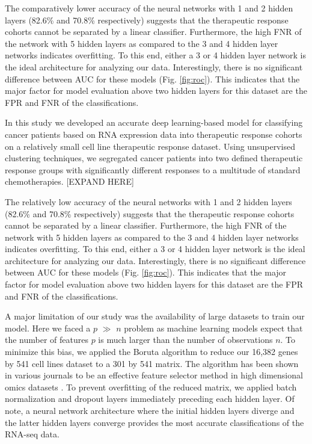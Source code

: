 \documentclass[10pt, letterpaper]{article}
\begin{document}
\begin{multicols}{2}
The comparatively lower accuracy of the neural networks with 1 and 2 hidden layers (82.6\% and 70.8\% respectively) suggests that the therapeutic response cohorts cannot be separated by a linear classifier. Furthermore, the high FNR of the network with 5 hidden layers as compared to the 3 and 4 hidden layer networks indicates overfitting. To this end, either a 3 or 4 hidden layer network is the ideal architecture for analyzing our data. Interestingly, there is no significant difference between AUC for these models (Fig. \ref{fig:roc}). This indicates that the major factor for model evaluation above two hidden layers for this dataset are the FPR and FNR of the classifications.

In this study we developed an accurate deep learning-based model for classifying cancer patients based on RNA expression data into therapeutic response cohorts on a relatively small cell line therapeutic response dataset. Using unsupervised clustering techniques, we segregated cancer patients into two defined therapeutic response groups with significantly different responses to a multitude of standard chemotherapies. [EXPAND HERE]

The relatively low accuracy of the neural networks with 1 and 2 hidden layers (82.6\% and 70.8\% respectively) suggests that the therapeutic response cohorts cannot be separated by a linear classifier. Furthermore, the high FNR of the network with 5 hidden layers as compared to the 3 and 4 hidden layer networks indicates overfitting. To this end, either a 3 or 4 hidden layer network is the ideal architecture for analyzing our data. Interestingly, there is no significant difference between AUC for these models (Fig. \ref{fig:roc}). This indicates that the major factor for model evaluation above two hidden layers for this dataset are the FPR and FNR of the classifications.

A major limitation of our study was the availability of large datasets to train our model. Here we faced a $p$ $\gg$ $n$ problem as machine learning models expect that the number of features $p$ is much larger than the number of observations $n$. To minimize this bias, we applied the Boruta algorithm to reduce our 16,382 genes by 541 cell lines dataset to a 301 by 541 matrix. The algorithm has been shown in various journals to be an effective feature selector method in high dimensional omics datasets \cite{boruta}. To prevent overfitting of the reduced matrix, we applied batch normalization and dropout layers immediately preceding each hidden layer. Of note, a neural network architecture where the initial hidden layers diverge and the latter hidden layers converge provides the most accurate classifications of the RNA-seq data.


\end{multicols}
\end{document}
